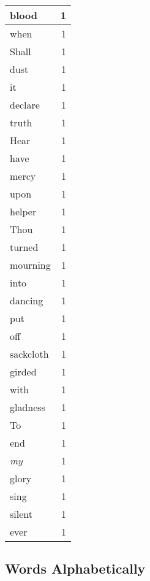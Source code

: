 \begin{center}
\begin{longtable}{l|r}
blood & 1 \\ \hline
when & 1 \\ \hline
Shall & 1 \\ \hline
dust & 1 \\ \hline
it & 1 \\ \hline
declare & 1 \\ \hline
truth & 1 \\ \hline
Hear & 1 \\ \hline
have & 1 \\ \hline
mercy & 1 \\ \hline
upon & 1 \\ \hline
helper & 1 \\ \hline
Thou & 1 \\ \hline
turned & 1 \\ \hline
mourning & 1 \\ \hline
into & 1 \\ \hline
dancing & 1 \\ \hline
put & 1 \\ \hline
off & 1 \\ \hline
sackcloth & 1 \\ \hline
girded & 1 \\ \hline
with & 1 \\ \hline
gladness & 1 \\ \hline
To & 1 \\ \hline
end & 1 \\ \hline
\emph{my} & 1 \\ \hline
glory & 1 \\ \hline
sing & 1 \\ \hline
silent & 1 \\ \hline
ever & 1 \\ \hline
\end{longtable}
\end{center}



\normalsize



\subsection{Words Alphabetically}

